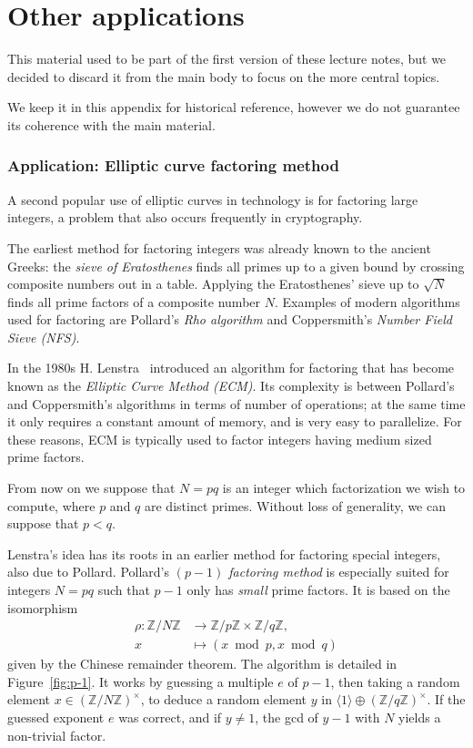 \documentclass[10pt]{article}
\theoremstyle{plain}
\theoremstyle{definition}
\begin{document}

\clearpage
\appendix
\part{Other applications}

This material used to be part of the first version of these lecture
notes, but we decided to discard it from the main body to focus on the
more central topics.

We keep it in this appendix for historical reference, however we do
not guarantee its coherence with the main material.

\section{Application: Elliptic curve factoring method}

A second popular use of elliptic curves in technology is for factoring
large integers, a problem that also occurs frequently in cryptography.

The earliest method for factoring integers was already known to the
ancient Greeks: the \emph{sieve of Eratosthenes} finds all primes up
to a given bound by crossing composite numbers out in a table. %
Applying the Eratosthenes' sieve up to $\sqrt{N}$ finds all prime
factors of a composite number $N$. %
Examples of modern algorithms used for factoring are Pollard's
\emph{Rho algorithm} and Coppersmith's \emph{Number Field Sieve
  (NFS)}.

In the 1980s H. Lenstra~\cite{lenstra87} introduced an algorithm for
factoring that has become known as the \emph{Elliptic Curve Method
  (ECM)}. %
Its complexity is between Pollard's and Coppersmith's algorithms in
terms of number of operations; at the same time it only requires a
constant amount of memory, and is very easy to parallelize. %
For these reasons, ECM is typically used to factor integers having
medium sized prime factors.

From now on we suppose that $N=pq$ is an integer which factorization
we wish to compute, where $p$ and $q$ are distinct primes. %
Without loss of generality, we can suppose that $p<q$.

Lenstra's idea has its roots in an earlier method for factoring
special integers, also due to Pollard. %
Pollard's \emph{$(p-1)$ factoring method} is especially suited for
integers $N=pq$ such that $p-1$ only has \emph{small} prime factors. %
It is based on the isomorphism
\begin{align*}
  \rho : ℤ/Nℤ &\to ℤ/pℤ × ℤ/qℤ,\\
  x &\mapsto (x \bmod p, x \bmod q)
\end{align*}
given by the Chinese remainder theorem. %
The algorithm is detailed in Figure~\ref{fig:p-1}. %
It works by guessing a multiple $e$ of $p-1$, then taking a random
element $x∈(ℤ/Nℤ)^{×}$, to deduce a random element $y$ in
$〈1〉⊕(ℤ/qℤ)^{×}$. If the guessed exponent $e$ was correct, and if
$y≠1$, the gcd of $y-1$ with $N$ yields a non-trivial factor. %
\end{document}
